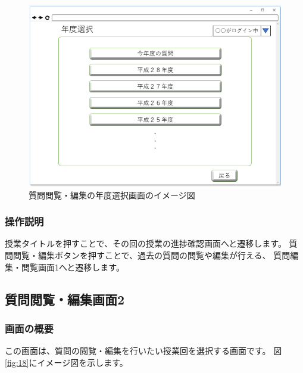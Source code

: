 \begin{figure}[htbp]
\begin{center}
  \includegraphics[width=1\linewidth,clip]{./img/17.png}
  \caption{質問閲覧・編集の年度選択画面のイメージ図}\label{fig:17}
\end{center}
\end{figure}

\subsubsection{操作説明}
授業タイトルを押すことで、その回の授業の進捗確認画面へと遷移します。
質問閲覧・編集ボタンを押すことで、過去の質問の閲覧や編集が行える、
質問編集・閲覧画面1へと遷移します。

\newpage

\subsection{質問閲覧・編集画面2}
\subsubsection{画面の概要}
この画面は、質問の閲覧・編集を行いたい授業回を選択する画面です。
図\ref{fig:18}にイメージ図を示します。

